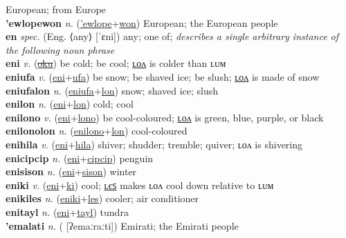 European; from Europe \label{'ewlopeak} \\
\textbf{'ewlopewon} \textit{n.} (\hyperref['ewlope]{'ewlope}+\hyperref[won]{won})
European; the European people \label{'ewlopewon} \\
\textbf{en} \textit{spec.} (Eng. ⟨any⟩ [ˈɛni])
any; one of; \textit{describes a single arbitrary instance of the following noun phrase} \label{en} \\
\textbf{eni} \textit{v.} (\hyperref[oku]{\sout{oku}})
be cold; be cool; \hyperref[enilon]{ʟᴏᴧ} is colder than ʟᴜᴍ \label{eni} \\
\textbf{eniufa} \textit{v.} (\hyperref[eni]{eni}+\hyperref[ufa]{ufa})
be snow; be shaved ice; be slush; \hyperref[eniufalon]{ʟᴏᴧ} is made of snow \label{eniufa} \\
\textbf{eniufalon} \textit{n.} (\hyperref[eniufa]{eniufa}+\hyperref[lon]{lon})
snow; shaved ice; slush \label{eniufalon} \\
\textbf{enilon} \textit{n.} (\hyperref[eni]{eni}+\hyperref[lon]{lon})
cold; cool \label{enilon} \\
\textbf{enilono} \textit{v.} (\hyperref[eni]{eni}+\hyperref[lono]{lono})
be cool-coloured; \hyperref[enilonolon]{ʟᴏᴧ} is green, blue, purple, or black \label{enilono} \\
\textbf{enilonolon} \textit{n.} (\hyperref[enilono]{enilono}+\hyperref[lon]{lon})
cool-coloured \label{enilonolon} \\
\textbf{enihila} \textit{v.} (\hyperref[eni]{eni}+\hyperref[hila]{hila})
shiver; shudder; tremble; quiver; ʟᴏᴧ is shivering \label{enihila} \\
\textbf{enicipcip} \textit{n.} (\hyperref[eni]{eni}+\hyperref[cipcip]{cipcip})
penguin \label{enicipcip} \\
\textbf{enisison} \textit{n.} (\hyperref[eni]{eni}+\hyperref[sison]{sison})
winter \label{enisison} \\
\textbf{eniki} \textit{v.} (\hyperref[eni]{eni}+\hyperref[ki]{ki})
cool; \hyperref[enikiles]{ʟєꜱ} makes ʟᴏᴧ cool down relative to ʟᴜᴍ \label{eniki} \\
\textbf{enikiles} \textit{n.} (\hyperref[eniki]{eniki}+\hyperref[les]{les})
cooler; air conditioner \label{enikiles} \\
\textbf{enitayl} \textit{n.} (\hyperref[eni]{eni}+\hyperref[tayl]{tayl})
tundra \label{enitayl} \\
\textbf{'emalati} \textit{n.} ( [ʔemaːraːti])
Emirati; the Emirati people \label{'emalati} \\
